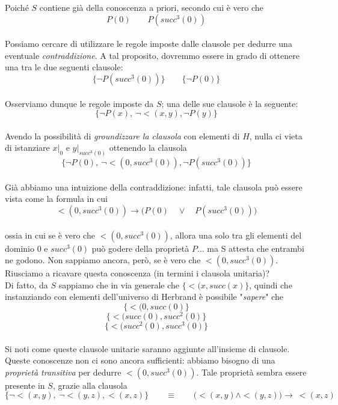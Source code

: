 \documentclass[a4paper,10pt]{article}
\begin{document}
{\begin{itemize}[label=, leftmargin=0pt]
\begin{osservazioni}
    Poiché $S$ contiene già della conoscenza a priori, secondo cui è vero che\\ 
    $$P(0) \quad \quad P(succ^3(0))$$\\
    Possiamo cercare di utilizzare le regole imposte dalle clausole per dedurre una eventuale \textit{contraddizione}. A tal proposito, dovremmo essere in grado di ottenere una tra le due seguenti clausole:\\
    $$\{\lnot P(succ^3(0))\}\quad \quad \{\lnot P(0)\}$$\\
    Osserviamo dunque le regole imposte da $S$; una delle sue clausole è la seguente:\\
    $$\{\lnot P(x),\ \lnot <(x,y),\lnot P(y)\}$$\\
    Avendo la possibilità di \textit{groundizzare la clausola} con elementi di $H$, nulla ci vieta di istanziare $x|_0$ e $y|_{succ^3(0)}$ ottenendo la clausola\\
    $$\{\lnot P(0),\ \lnot <(0,succ^3(0)),\lnot P(succ^3(0))\}$$\\
    Già abbiamo una intuizione della contraddizione: infatti, tale clausola può essere vista come la formula in cui
    $$<(0,succ^3(0))\rightarrow\bigg(P(0)\quad \lor\quad  P(succ^3(0))\bigg)$$\\
    ossia in cui se è vero che $<(0,succ^3(0))$, allora una solo tra gli elementi del dominio $0$ e $succ^3(0)$ può godere della proprietà $P$... ma S attesta che entrambi ne godono. Non sappiamo ancora, però, se è vero che $<(0,succ^3(0))$. Riusciamo a ricavare questa conoscenza (in termini i clausola unitaria)?\\

    Di fatto, da $S$ sappiamo che in via generale che $\{<(x,succ(x)\}$, quindi che instanziando con elementi dell'universo di Herbrand è possibile "\textit{sapere}" che
    $$\{<(0,succ(0)\}$$
    $$\{<(succ(0),succ^2(0)\}$$
    $$\{<(succ^2(0),succ^3(0)\}$$\\
    Si noti come queste clausole unitarie saranno aggiunte all'insieme di clausole.
    Queste conoscenze non ci sono ancora sufficienti: abbiamo bisogno di una \textit{proprietà transitiva} per dedurre $<(0,succ^3(0))$. Tale proprietà sembra essere presente in $S$, grazie alla clausola 
    $$\{\lnot<(x,y),\ \lnot <(y,z), <(x,z)\} \quad\quad \equiv  \quad\quad \bigg(<(x,y)\land <(y,z)\bigg) \rightarrow\ <(x,z)$$


\end{osservazioni}
\end{itemize}}
\end{document}
